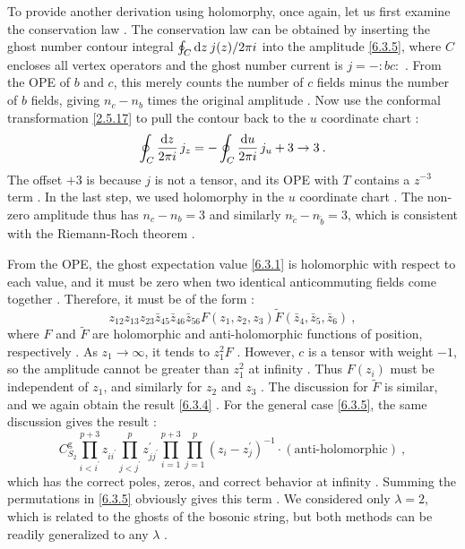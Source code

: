 To provide another derivation using holomorphy, once again, let us first examine the conservation law . The conservation law can be obtained by inserting the ghost number contour integral $\oint_{C} \mathrm{d} z \: j(z) / 2 \pi i$ into the amplitude \eqref{6.3.5}, where $C$ encloses all vertex operators and the ghost number current is $j=-:\mathrel{bc}:$ . From the OPE of $b$ and $c$, this merely counts the number of $c$ fields minus the number of $b$ fields, giving $n_{c}-n_{b}$ times the original amplitude . Now use the conformal transformation \eqref{2.5.17} to pull the contour back to the $u$ coordinate chart :
\begin{equation}
	\oint_{C} \frac{\mathrm{d} z}{2 \pi i}\, j_{z}=-\oint_{C} \frac{\mathrm{d} u}{2 \pi i}\, j_{u}+3 \to 3 \:. \label{6.3.6}
\end{equation}
The offset $+3$ is because $j$ is not a tensor, and its OPE with $T$ contains a $z^{-3}$ term . In the last step, we used holomorphy in the $u$ coordinate chart . The non-zero amplitude thus has $n_{c}-n_{b}=3$ and similarly $n_{\tilde{c}}-n_{\tilde{b}}=3$, which is consistent with the Riemann-Roch theorem .

From the OPE, the ghost expectation value \eqref{6.3.1} is holomorphic with respect to each value, and it must be zero when two identical anticommuting fields come together . Therefore, it must be of the form :
\begin{equation}
	z_{12} z_{13} z_{23} \bar{z}_{45} \bar{z}_{46} \bar{z}_{56} F(z_{1}, z_{2}, z_{3}) 
	\tilde{F}(\bar{z}_{4}, \bar{z}_{5}, \bar{z}_{6}) \:, \label{6.3.7}
\end{equation}
where $F$ and $\tilde{F}$ are holomorphic and anti-holomorphic functions of position, respectively . As $z_{1} \rightarrow \infty$, it tends to $z_{1}^{2} F$ . However, $c$ is a tensor with weight $-1$, so the amplitude cannot be greater than $z_{1}^{2}$ at infinity . Thus $F(z_{i})$ must be independent of $z_{1}$, and similarly for $z_{2}$ and $z_{3}$ . The discussion for $\tilde{F}$ is similar, and we again obtain the result \eqref{6.3.4} . For the general case \eqref{6.3.5}, the same discussion gives the result :
\begin{equation}
	C_{S_{2}}^{\mathrm{g}} \prod_{i<i^{\prime}}^{p+3} z_{i i^{\prime}} \prod_{j<j^{\prime}}^{p} z_{j j^{\prime}}^{\prime} 
	\prod_{i=1}^{p+3} \prod_{j=1}^{p}(z_{i}-z_{j}^{\prime})^{-1} \cdot(\text {anti-holomorphic}) \:, \label{6.3.8}
\end{equation}
which has the correct poles, zeros, and correct behavior at infinity . Summing the permutations in \eqref{6.3.5} obviously gives this term . We considered only $\lambda=2$, which is related to the ghosts of the bosonic string, but both methods can be readily generalized to any $\lambda$ .

